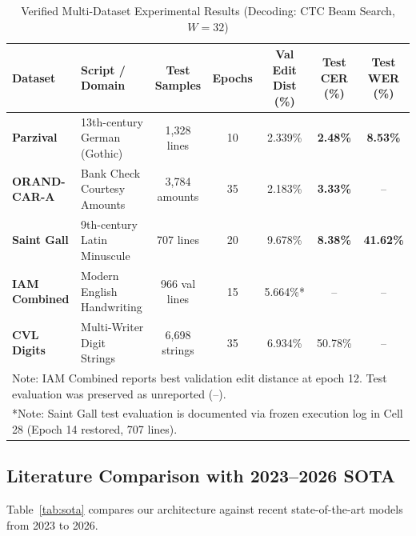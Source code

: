 \documentclass[twocolumn,10pt,a4paper]{article}
\begin{document}
\begin{table}[t]
\caption{Verified Multi-Dataset Experimental Results (Decoding: CTC Beam Search, $W=32$)}\label{tab:benchmark}
\begin{tabular*}{\textwidth}{@{\extracolsep\fill}llccccc@{\extracolsep\fill}}
\toprule
Dataset & Script / Domain & Test Samples & Epochs & Val Edit Dist (\%) & Test CER (\%) & Test WER (\%) \\
\midrule
\textbf{Parzival}     & 13th-century German (Gothic) & 1,328 lines   & 10 & 2.339\% & \textbf{2.48\%} & \textbf{8.53\%} \\
\textbf{ORAND-CAR-A}  & Bank Check Courtesy Amounts  & 3,784 amounts & 35 & 2.183\% & \textbf{3.33\%} & -- \\
\textbf{Saint Gall}   & 9th-century Latin Minuscule  & 707 lines     & 20 & 9.678\% & \textbf{8.38\%} & \textbf{41.62\%} \\
\textbf{IAM Combined} & Modern English Handwriting   & 966 val lines & 15 & 5.664\%*& --              & -- \\
\textbf{CVL Digits}   & Multi-Writer Digit Strings   & 6,698 strings & 35 & 6.934\% & 50.78\%         & -- \\
\bottomrule
\multicolumn{7}{l}{\footnotesize *Note: IAM Combined reports best validation edit distance at epoch 12. Test evaluation was preserved as unreported (--).} \\
\multicolumn{7}{l}{\footnotesize **Note: Saint Gall test evaluation is documented via frozen execution log in Cell 28 (Epoch 14 restored, 707 lines).} \\
\end{tabular*}
\end{table}

\subsection{Literature Comparison with 2023–2026 SOTA}
Table~\ref{tab:sota} compares our architecture against recent state-of-the-art models from 2023 to 2026.
\end{document}
